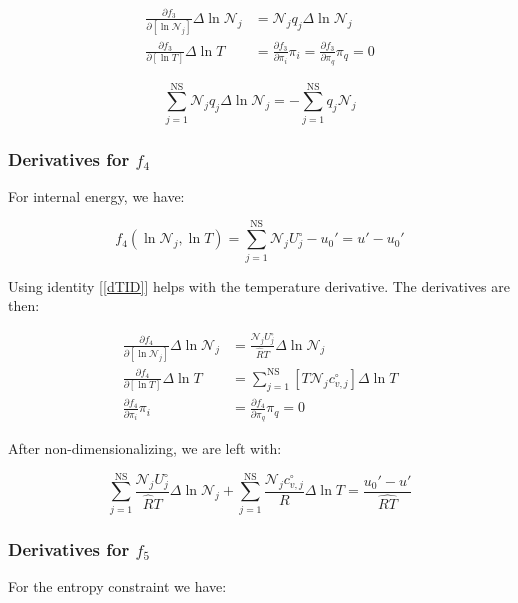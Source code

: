 \documentclass[10pt]{article}
\begin{document}
\begin{flushleft}
\begin{align}
    \frac{\partial f_3}{\partial [\ln \mathcal{N}_j]} \Delta \ln \mathcal{N}_j &= \mathcal{N}_j q_j \Delta \ln \mathcal{N}_j
    \\ \frac{\partial f_3}{\partial [\ln T]} \Delta \ln T &= \frac{\partial f_3}{\partial \pi_i} \pi_i = \frac{\partial f_3}{\partial \pi_q} \pi_q = 0
\end{align} 

\begin{equation*}
    \boxed{ \sum_{j=1}^\text{NS}\mathcal{N}_j q_j \Delta \ln \mathcal{N}_j = -\sum_{j=1}^\text{NS} q_j \mathcal{N}_j}
\end{equation*}


\subsubsection{Derivatives for $f_4$}
For internal energy, we have:

\begin{equation}
    f_4(\ln \mathcal{N}_j, \ln T) = \sum_{j=1}^\text{NS} \mathcal{N}_j U_j^\circ - u_0' = u' - u_0'
\end{equation}

Using identity [\ref{dTID}] helps with the temperature derivative. The derivatives are then:

\begin{align}
    \frac{\partial f_4}{\partial [\ln \mathcal{N}_j]} \Delta \ln \mathcal{N}_j &= \frac{\mathcal{N}_jU_j^\circ}{\hat{R}T} \Delta \ln \mathcal{N}_j
    \\ \frac{\partial f_4}{\partial [\ln T]} \Delta \ln T &= \sum_{j=1}^\text{NS} [T \mathcal{N}_jc_{v,j}^\circ] \Delta \ln T
    \\ \frac{\partial f_4}{\partial \pi_i} \pi_i &= \frac{\partial f_4}{\partial \pi_q} \pi_q = 0
\end{align}

After non-dimensionalizing, we are left with:

\begin{equation*}
    \boxed{ \sum_{j=1}^\text{NS}\frac{\mathcal{N}_jU_j^\circ}{\hat{R}T} \Delta \ln \mathcal{N}_j + \sum_{j=1}^\text{NS} \frac{ \mathcal{N}_jc_{v,j}^\circ}{R} \Delta \ln T = \frac{u_0' - u'}{\hat{RT}}}
\end{equation*}

\subsubsection{Derivatives for $f_5$}
For the entropy constraint we have:


\end{flushleft}
\end{document}
